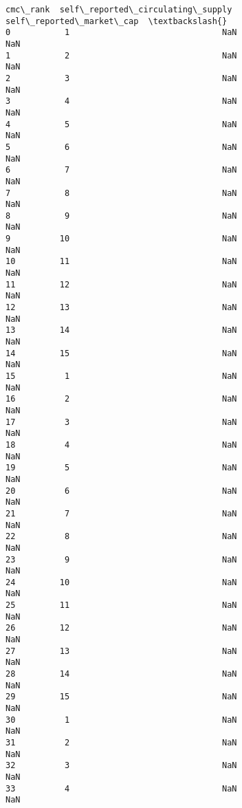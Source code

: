 \documentclass[11pt]{article}
\begin{document}
\begin{tcolorbox}[breakable, size=fbox, boxrule=.5pt, pad at break*=1mm, opacityfill=0]
\begin{Verbatim}[commandchars=\\\{\}]
     cmc\_rank  self\_reported\_circulating\_supply  self\_reported\_market\_cap  \textbackslash{}
0           1                               NaN                       NaN
1           2                               NaN                       NaN
2           3                               NaN                       NaN
3           4                               NaN                       NaN
4           5                               NaN                       NaN
5           6                               NaN                       NaN
6           7                               NaN                       NaN
7           8                               NaN                       NaN
8           9                               NaN                       NaN
9          10                               NaN                       NaN
10         11                               NaN                       NaN
11         12                               NaN                       NaN
12         13                               NaN                       NaN
13         14                               NaN                       NaN
14         15                               NaN                       NaN
15          1                               NaN                       NaN
16          2                               NaN                       NaN
17          3                               NaN                       NaN
18          4                               NaN                       NaN
19          5                               NaN                       NaN
20          6                               NaN                       NaN
21          7                               NaN                       NaN
22          8                               NaN                       NaN
23          9                               NaN                       NaN
24         10                               NaN                       NaN
25         11                               NaN                       NaN
26         12                               NaN                       NaN
27         13                               NaN                       NaN
28         14                               NaN                       NaN
29         15                               NaN                       NaN
30          1                               NaN                       NaN
31          2                               NaN                       NaN
32          3                               NaN                       NaN
33          4                               NaN                       NaN

\end{Verbatim}
\end{tcolorbox}
\end{document}
